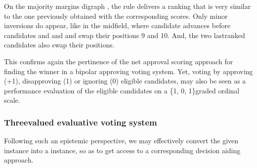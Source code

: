 \documentclass[a4paper,12pt,english]{sphinxhowto}
\begin{document}
\begin{sphinxVerbatim}[commandchars=\\\{\},numbers=left,firstnumber=1,stepnumber=1]
\end{sphinxVerbatim}

\sphinxAtStartPar
On the  majority margins digraph , the  rule delivers a ranking that is very similar to the one previously obtained with the corresponding  scores. Only minor inversions do appear, like in the midfield, where candidate  advances before candidates  and  and  and  swap their positions 9 and 10. And, the two last\sphinxhyphen{}ranked candidates also swap their positions.

\sphinxAtStartPar
This confirms again the pertinence of the net approval scoring approach for finding the winner in a bipolar approving voting system. Yet, voting by approving (+1), disapproving (\sphinxhyphen{}1) or ignoring (0) eligible candidates, may also be seen as a performance evaluation of the eligible candidates on a \{\sphinxhyphen{}1, 0, 1\}\sphinxhyphen{}graded ordinal scale.


\subsubsection{Three\sphinxhyphen{}valued evaluative voting system}
\label{\detokenize{pearls:three-valued-evaluative-voting-system}}
\sphinxAtStartPar
Following such an epistemic perspective, we may effectively convert the given  instance into a  instance, so as to get access to a corresponding  decision aiding approach.
\end{document}
